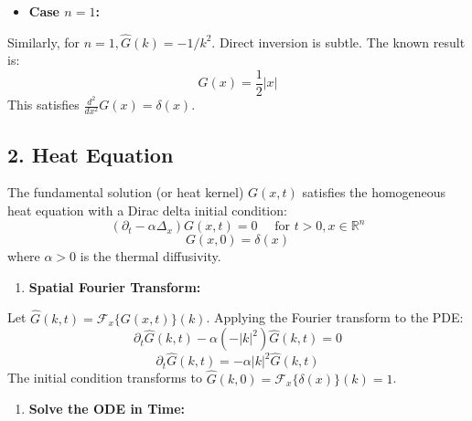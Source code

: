 \begin{itemize}
	\item \textbf{Case $n=1$:}
\end{itemize}

Similarly, for $n=1, \widehat{G}(k)=-1 / k^2$. Direct inversion is subtle. The known result is:
\[
G(x)=\frac{1}{2}|x|
\]
This satisfies $\frac{d^2}{d x^2} G(x)=\delta(x)$.


\subsection{2. Heat Equation}

The fundamental solution (or heat kernel) $G(x, t)$ satisfies the homogeneous heat equation with a Dirac delta initial condition:
\[
\left(\partial_t-\alpha \Delta_x\right) G(x, t)=0 \quad \text { for } t>0, x \in \mathbb{R}^n
\]
\[
G(x, 0)=\delta(x)
\]
where $\alpha>0$ is the thermal diffusivity.

\begin{enumerate}
	\item \textbf{Spatial Fourier Transform:}
\end{enumerate}

Let $\widehat{G}(k, t)=\mathcal{F}_x\{G(x, t)\}(k)$. Applying the Fourier transform to the PDE:
\[
\partial_t \widehat{G}(k, t)-\alpha\left(-|k|^2\right) \widehat{G}(k, t)=0
\]
\[
\partial_t \widehat{G}(k, t)=-\alpha|k|^2 \widehat{G}(k, t)
\]
The initial condition transforms to $\widehat{G}(k, 0)=\mathcal{F}_x\{\delta(x)\}(k)=1$.

\begin{enumerate}
	\item \textbf{Solve the ODE in Time:}
\end{enumerate}

